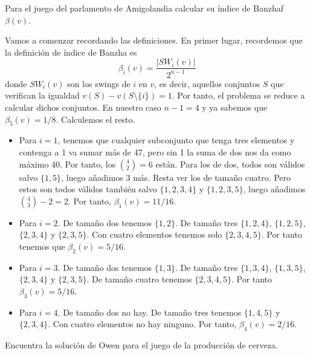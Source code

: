 \documentclass[twoside]{article}
\begin{document}
\begin{ejercicio}{8}
Para el juego del parlamento de Amigolandia calcular su índice de Banzhaf $\beta(v)$. 
\end{ejercicio}
\begin{solucion}
Vamos a comenzar recordando las definiciones. En primer lugar, recordemos que la definición de índice de Banzha es 
$$
\beta_i(v) = \frac{|SW_i(v)|}{2^{n-1}}
$$
donde $SW_i(v)$ son los swings de $i$ en $v$, es decir, aquellos conjuntos $S$ que verifican la igualdad $v(S)-v(S\setminus\{i\}) = 1$. Por tanto, el problema se reduce a calcular dichos conjuntos. En nuestro caso $n-1 =4$ y ya sabemos que $\beta_5(v)=1/8$. Calculemos el resto.
\begin{itemize}
\item Para $i=1$, tenemos que cualquier subconjunto que tenga tres elementos y contenga a 1 va sumar más de 47, pero sin 1 la suma de dos nos da como máximo 40. Por tanto, los $\binom{4}{2} = 6$ están. Para los de dos, todos son válidos salvo $\{1,5\}$, luego añadimos $3$ más. Resta ver los de tamaño cuatro. Pero estos son todos válidos también salvo $\{1,2,3,4\}$ y $\{1,2,3,5\}$, luego añadimos $\binom{4}{3}-2 =2$. Por tanto, $\beta_1(v) = 11/16$.
\item Para $i=2$. De tamaño dos tenemos $\{1,2\}$. De tamaño tres $\{1,2,4\}$, $\{1,2,5\}$, $\{2,3,4\}$ y $\{2,3,5\}$. Con cuatro elementos tenemos solo $\{2,3,4,5\}$. Por tanto tenemos que $\beta_2(v)=5/16$.
\item Para $i=3$. De tamaño dos tenemos $\{1,3\}$. De tamaño tres $\{1,3,4\}$, $\{1,3,5\}$, $\{2,3,4\}$ y $\{2,3,5\}$. De tamaño cuatro tenemos $\{2,3,4,5\}$. Por tanto $\beta_3(v)= 5/16$.
\item Para $i=4$. De tamaño dos no hay. De tamaño tres tenemos $\{1,4,5\}$ y $\{2,3,4\}$. Con cuatro elementos no hay ninguno. Por tanto, $\beta_4(v) = 2/16$. \end{itemize}
\end{solucion}

\newpage

\begin{ejercicio}{9}
Encuentra la solución de Owen para el juego de la producción de cerveza.
\end{ejercicio}
\end{document}
